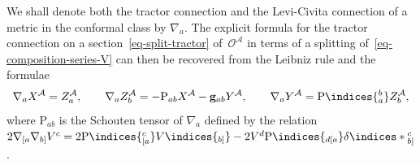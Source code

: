 \documentclass[10pt,a4paper]{amsart}
\numberwithin{equation}{section}
\newcommand{\mc} [1]{\mathcal{#1}}
\newcommand{\ind} {\indices}
\newcommand{\Rho} {\mathrm{P}}
\begin{document}
We shall denote both the tractor connection and the Levi-Civita connection of a metric in the conformal class by $\nabla_a$. The explicit formula for the tractor connection on a section~\eqref{eq-split-tractor} of~$\mc{O}^\mc{A}$ in terms of a splitting of~\eqref{eq-composition-series-V} can then be recovered from the Leibniz rule and the formulae
\begin{gather}\label{eq-progXYZ}
\nabla_a X^\mc{A} = Z^\mc{A}_a , \qquad
\nabla_a Z^\mc{A}_b = - \Rho_{ab} X^\mc{A} - \mathbf{g}_{ab} Y^\mc{A} , \qquad
\nabla_a Y^\mc{A} = \Rho \ind{_a^b} Z^\mc{A}_b ,
\end{gather}
where $\Rho_{ab}$ is the Schouten tensor of $\nabla_a$ def\/ined by the relation $2 \nabla_{[a} \nabla_{b]} V^c = 2 \Rho \ind{^c_{[a}} V \ind{_{b]}} - 2 V^d \Rho \ind{_{d[a}} \delta \ind*{_{b]}^c} $.
\end{document}
